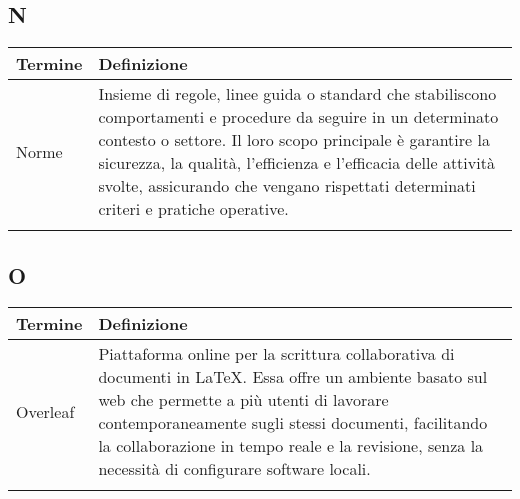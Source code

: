 \documentclass[10pt]{article}
\begin{document}
\subsection{N} %
\begin{tabularx}{\textwidth}{|>{\centering\arraybackslash}l|X|}
\hline
\rowcolor[gray]{0.8}
\textbf{Termine} & \textbf{Definizione}\\
\hline
Norme & Insieme di regole, linee guida o standard che stabiliscono comportamenti e procedure da seguire in un determinato contesto o settore. Il loro scopo principale è garantire la sicurezza, la qualità, l'efficienza e l'efficacia delle attività svolte, assicurando che vengano rispettati determinati criteri e pratiche operative.\\
\hline
 & \\
\hline
\end{tabularx}

\subsection{O} %
\begin{tabularx}{\textwidth}{|>{\centering\arraybackslash}l|X|}
\hline
\rowcolor[gray]{0.8}
\textbf{Termine} & \textbf{Definizione}\\
\hline
Overleaf & Piattaforma online per la scrittura collaborativa di documenti in \LaTeX. Essa offre un ambiente basato sul web che permette a più utenti di lavorare contemporaneamente sugli stessi documenti, facilitando la collaborazione in tempo reale e la revisione, senza la necessità di configurare software locali.\\
\hline
 & \\
\hline
\end{tabularx}
\end{document}
